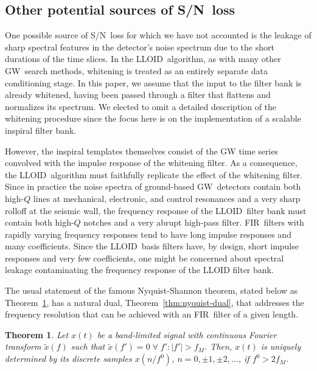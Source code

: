 \documentclass[preprint2]{aastex}
\newtheorem{thm}{Theorem}
\newcommand{\GW}{GW}%
\newcommand{\SNR}{S/N}%
\newcommand{\fir}{FIR}%
\newcommand{\lloid}{LLOID}%
\begin{document}
\subsection{Other potential sources of \SNR\ loss}

One possible source of \SNR\ loss for which we have not accounted is the leakage of sharp spectral features in the detector's noise spectrum due to the short durations of the time slices.  In the \lloid\ algorithm, as with many other \GW\ search methods, whitening is treated as an entirely separate data conditioning stage.  In this paper, we assume that the input to the filter bank is already whitened, having been passed through a filter that flattens and normalizes its spectrum.  We elected to omit a detailed description of the whitening procedure since the focus here is on the implementation of a scalable inspiral filter bank.

However, the inspiral templates themselves consist of the GW time series convolved with the impulse response of the whitening filter.  As a consequence, the \lloid\ algorithm must faithfully replicate the effect of the whitening filter.  Since in practice the noise spectra of ground-based \GW\ detectors contain both high-$Q$ lines at mechanical, electronic, and control resonances and a very sharp rolloff at the seismic wall, the frequency response of the \lloid\ filter bank must contain both high-$Q$ notches and a very abrupt high-pass filter.  \fir\ filters with rapidly varying frequency responses tend to have long impulse responses and many coefficients.  Since the \lloid\ basis filters have, by design, short impulse responses and very few coefficients, one might be concerned about spectral leakage contaminating the frequency response of the LLOID filter bank.

The usual statement of the famous Nyquist-Shannon theorem, stated below as Theorem~\ref{thm:nyquist}, has a natural dual, Theorem~\ref{thm:nyquist-dual}, that addresses the frequency resolution that can be achieved with an \fir\ filter of a given length.

\begin{thm}
	\label{thm:nyquist}
	\citep[After][p. 518]{oppenheim1997signals}
	Let $x(t)$ be a band-limited signal with continuous Fourier transform $\tilde{x}(f)$ such that $\tilde{x}(f') = 0 \; \forall \; f' : |f'| > f_M$.  Then, $x(t)$ is uniquely determined by its discrete samples $x(n/f^0)$, $n = 0, \pm 1, \pm 2, \dots$, if $f^0 > 2 f_M$.
\end{thm}
\end{document}
